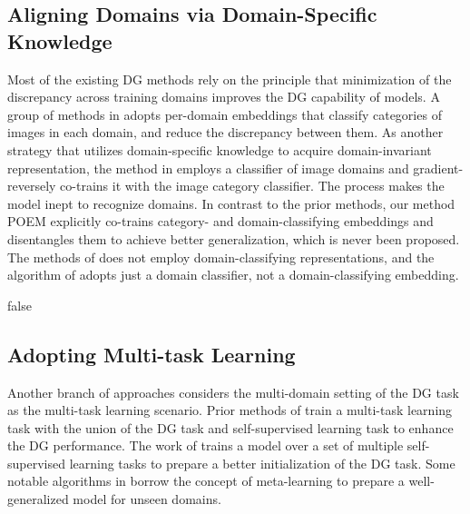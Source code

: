 \documentclass[letterpaper]{article} \usepackage{aaai23}  \usepackage{times}  \usepackage{helvet}  \usepackage{courier}  \usepackage[hyphens]{url}  \usepackage{graphicx} \urlstyle{rm} \def\UrlFont{\rm}  \usepackage{natbib}  \usepackage{caption} \frenchspacing  \setlength{\pdfpagewidth}{8.5in}  \setlength{\pdfpageheight}{11in}  \usepackage[labelsep=period]{caption}
\begin{document}
\subsection{Aligning Domains via Domain-Specific Knowledge}
Most of the existing DG methods rely on the principle that minimization of the discrepancy across training domains improves the DG capability of models.
A group of methods in \cite{DSN, bestsource} adopts per-domain embeddings that classify categories of images in each domain, and reduce the discrepancy between them. As another strategy that utilizes domain-specific knowledge to acquire domain-invariant representation, the method in \cite{AD_DA1} employs a classifier of image domains and gradient-reversely co-trains it with the image category classifier. The process makes the model inept to recognize domains.
In contrast to the prior methods, our method POEM explicitly co-trains category- and domain-classifying embeddings and disentangles them to achieve better generalization, which is never been proposed.
The methods of \cite{DSN, bestsource} does not employ domain-classifying representations, and the algorithm of \cite{AD_DA1} adopts just a domain classifier, not a domain-classifying embedding.



\if false
\subsection{Adopting Multi-task Learning}
Another branch of approaches considers the multi-domain setting of the DG task as the multi-task learning scenario. 
Prior methods of \cite{extrinsic_supervision_DG_MTL, jigsaw_DG_MTL} train a multi-task learning task with the union of the DG task and self-supervised learning task to enhance the DG performance. 
The work of \cite{multi-generalization} trains a model over a set of multiple self-supervised learning tasks to prepare a better initialization of the DG task.
Some notable algorithms in \cite{MLDG, MASF} borrow the concept of meta-learning to prepare a well-generalized model for unseen domains.
\fi
\end{document}
